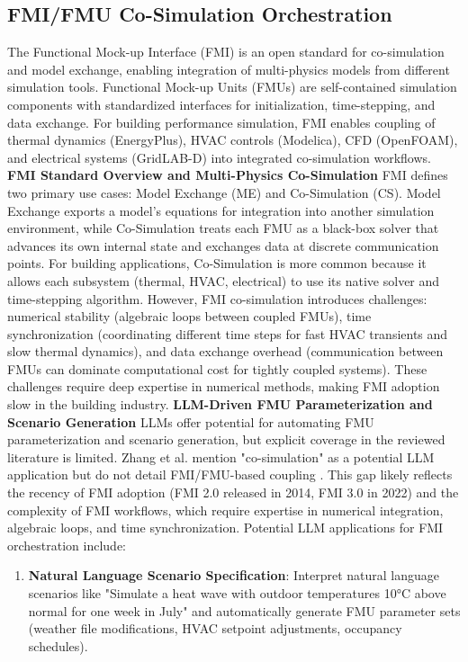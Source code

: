 \documentclass[12pt,a4paper]{article}
\begin{document}
\subsection{FMI/FMU Co-Simulation Orchestration}
The Functional Mock-up Interface (FMI) is an open standard for co-simulation and model exchange, enabling integration of multi-physics models from different simulation tools. Functional Mock-up Units (FMUs) are self-contained simulation components with standardized interfaces for initialization, time-stepping, and data exchange. For building performance simulation, FMI enables coupling of thermal dynamics (EnergyPlus), HVAC controls (Modelica), CFD (OpenFOAM), and electrical systems (GridLAB-D) into integrated co-simulation workflows.
\textbf{FMI Standard Overview and Multi-Physics Co-Simulation}
FMI defines two primary use cases: Model Exchange (ME) and Co-Simulation (CS). Model Exchange exports a model's equations for integration into another simulation environment, while Co-Simulation treats each FMU as a black-box solver that advances its own internal state and exchanges data at discrete communication points. For building applications, Co-Simulation is more common because it allows each subsystem (thermal, HVAC, electrical) to use its native solver and time-stepping algorithm.
However, FMI co-simulation introduces challenges: numerical stability (algebraic loops between coupled FMUs), time synchronization (coordinating different time steps for fast HVAC transients and slow thermal dynamics), and data exchange overhead (communication between FMUs can dominate computational cost for tightly coupled systems). These challenges require deep expertise in numerical methods, making FMI adoption slow in the building industry.
\textbf{LLM-Driven FMU Parameterization and Scenario Generation}
LLMs offer potential for automating FMU parameterization and scenario generation, but explicit coverage in the reviewed literature is limited. Zhang et al. mention "co-simulation" as a potential LLM application but do not detail FMI/FMU-based coupling \cite{ref67}. This gap likely reflects the recency of FMI adoption (FMI 2.0 released in 2014, FMI 3.0 in 2022) and the complexity of FMI workflows, which require expertise in numerical integration, algebraic loops, and time synchronization.
Potential LLM applications for FMI orchestration include:
\begin{enumerate}
  \item \textbf{Natural Language Scenario Specification}: Interpret natural language scenarios like "Simulate a heat wave with outdoor temperatures 10°C above normal for one week in July" and automatically generate FMU parameter sets (weather file modifications, HVAC setpoint adjustments, occupancy schedules).
\end{enumerate}
\end{document}
